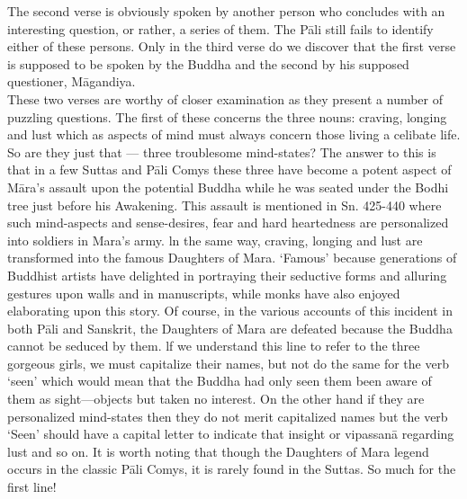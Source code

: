 The second verse is obviously spoken by another person who concludes with an interesting question, or rather, a series of them. The P\=ali still fails to identify either of these persons. Only in the third verse do we discover that the first verse is supposed to be spoken by the Buddha and the second by his supposed questioner, M\=agandiya.\\

These two verses are worthy of closer examination as they present a number of puzzling questions. The first of these concerns the three nouns: craving, longing and lust which as aspects of mind must always concern those living a celibate life. So are they just that — three troublesome mind-states? The answer to this is that in a few Suttas and P\=ali Comys these three have become a potent aspect of M\=ara's assault upon the potential Buddha while he was seated under the Bodhi tree just before his Awakening. This assault is mentioned in Sn. 425-440 where such mind-aspects and sense-desires, fear and hard heartedness are personalized into soldiers in Mara's army. ln the same way, craving, longing and lust are transformed into the famous Daughters of Mara. `Famous' because generations of Buddhist artists have delighted in portraying their seductive forms and alluring gestures upon walls and in manuscripts, while monks have also enjoyed elaborating  upon this story. Of course, in the various accounts of this incident in both P\=ali and Sanskrit, the Daughters of Mara are defeated because the Buddha cannot be seduced by them. lf we understand this line to refer to the three gorgeous girls, we must capitalize their names, but not do the same for the verb `seen' which would mean that the Buddha had only seen them been aware of them as sight—objects but taken no interest. On the other hand if they are personalized mind-states then they do not merit capitalized names but the verb `Seen' should have a capital letter to indicate that insight or vipassan\=a regarding lust and so on. It is worth noting that though the Daughters of Mara legend occurs in the classic P\=ali Comys, it is rarely found in the Suttas. So much for the first line!\\

